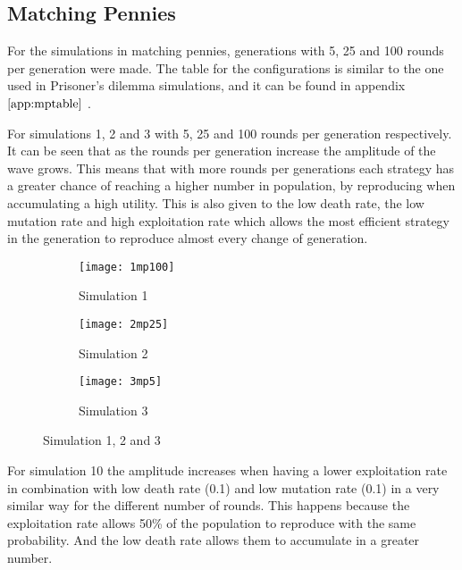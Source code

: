 \subsection{Matching Pennies}

For the simulations in matching pennies, generations with 5, 25 and 100 rounds per generation were made.  The table for the configurations is similar to the one used in Prisoner's dilemma simulations, and it can be found in appendix $\ref{app:mptable}$ .

For simulations 1, 2 and 3 with 5, 25 and 100 rounds per generation respectively. It can be seen that as the rounds per generation increase the amplitude of the wave grows. This means that with more rounds per generations each strategy has a greater chance of reaching a higher number in population, by reproducing when accumulating a high utility. This is also given to the low death rate, the low mutation rate and high exploitation rate which allows the most efficient strategy in the generation to reproduce almost every change of generation.

\begin{figure}[H]       
    \centering
    \begin{subfigure}[b]{0.3\textwidth}
	\centering
	{\texttt{[image: 1mp100]}}   
    	\caption{Simulation 1}
	\label{fig:mpsim1}
    \end{subfigure}
    \hfill
    \begin{subfigure}[b]{0.3\textwidth}
	\centering
	{\texttt{[image: 2mp25]}}   
    	\caption{Simulation 2}
	\label{fig:mpsim2}
    \end{subfigure}
    \hfill
    \begin{subfigure}[b]{0.3\textwidth}
	\centering
	{\texttt{[image: 3mp5]}}   
    	\caption{Simulation 3}
	\label{fig:mpsim3}
    \end{subfigure}
    \caption{Simulation 1, 2 and 3}
    \label{firstthreesimulations}
\end{figure}

For simulation 10 the amplitude increases when having a lower exploitation rate in combination with low death rate (0.1) and low mutation rate (0.1) in a very similar way for the different number of rounds. This happens because the exploitation rate allows 50\% of the population to reproduce with the same probability. And the low death rate allows them to accumulate in a greater number.

